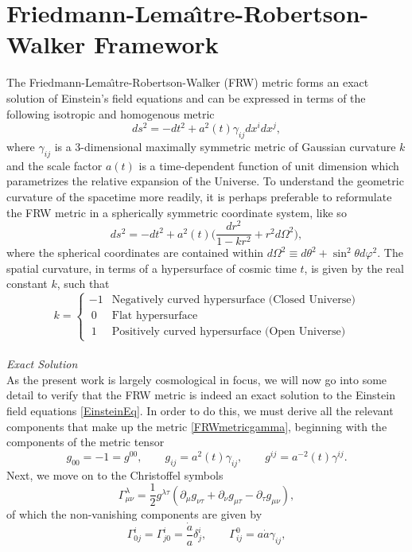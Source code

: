 \chapter{Friedmann-Lema\^{\i}tre-Robertson-Walker Framework}
\label{sec:introcos}
The Friedmann-Lema\^{\i}tre-Robertson-Walker (FRW) metric forms an exact solution of Einstein's field equations and can be expressed in terms of the following isotropic and homogenous metric
\[
\label{FRWmetricgamma}
ds^2=-dt^2 +a^2(t)\gamma_{ij}dx^i dx^j
,\]
where $\gamma_{ij}$ is a 3-dimensional  maximally symmetric metric of Gaussian curvature $k$ and the scale factor $a(t)$ is a time-dependent function of unit dimension which parametrizes the relative expansion of the Universe. To understand the geometric curvature of the spacetime more readily, it is perhaps preferable to reformulate the FRW metric in a spherically symmetric coordinate system, like so
\[
ds^2=-dt^2+a^2(t)\biggl(\frac{dr^2}{1-kr^2}+r^2 d\Omega^2\biggr)
,\]
where the spherical coordinates are contained within $d\Omega^2\equiv d\theta^2+\sin^2\theta d\varphi^2$. The spatial curvature, in terms of a hypersurface of cosmic time $t$, is given by the real constant $k$, such that
\\
  \begin{equation}
    k=
    \begin{cases}
    -1 & \text{Negatively curved hypersurface  (Closed Universe)} \\
      ~0 & \text{Flat hypersurface} \\
      ~1 & \text{Positively curved hypersurface (Open Universe)}
    \end{cases}
  \end{equation}
\\\emph{Exact Solution}\\  
As the present work is largely cosmological in focus, we will now go into some detail to verify that the FRW metric is indeed an exact solution to the Einstein field equations \eqref{EinsteinEq}. In order to do this, we must derive all the relevant components that make up the metric \eqref{FRWmetricgamma}, beginning with the components of the metric tensor
  \[
  g_{00}=-1=g^{00},\qquad g_{ij}=a^2(t)\gamma_{ij}, \qquad g^{ij}=a^{-2}(t)\gamma^{ij}
  .\]
  Next, we move on to the Christoffel symbols
  \[
  \Gamma^\lambda_{\mu\nu}=\frac{1}{2}g^{\lambda\tau}(\partial_\mu g_{\nu\tau}+\partial_\nu g_{\mu\tau}-\partial_\tau g_{\mu\nu})
  ,\]
  of which the non-vanishing components are given by
  \[
  \Gamma^i_{0j}=\Gamma^i_{j0}=\frac{\dot{a}}{a}\delta^i_j,\qquad \Gamma^0_{ij}= a \dot{a} \gamma_{ij},
  \]
